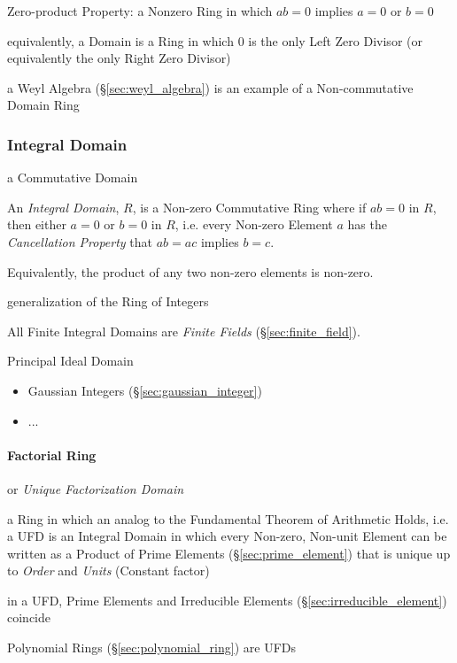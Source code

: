 Zero-product Property: a Nonzero Ring in which $ab = 0$ implies $a = 0$ or
$b = 0$

equivalently, a Domain is a Ring in which $0$ is the only Left Zero Divisor (or
equivalently the only Right Zero Divisor)

a Weyl Algebra (\S\ref{sec:weyl_algebra}) is an example of a Non-commutative
Domain Ring



\subsubsection{Integral Domain}\label{sec:integral_domain}

a Commutative Domain

An \emph{Integral Domain}, $R$, is a Non-zero Commutative Ring where if $ab = 0$
in $R$, then either $a = 0$ or $b = 0$ in $R$, i.e. every Non-zero Element $a$
has the \emph{Cancellation Property} that $ab = ac$ implies $b = c$.

Equivalently, the product of any two non-zero elements is non-zero.

generalization of the Ring of Integers

All Finite Integral Domains are \emph{Finite Fields} (\S\ref{sec:finite_field}).

Principal Ideal Domain

\begin{itemize}
  \item Gaussian Integers (\S\ref{sec:gaussian_integer})
  \item ...
\end{itemize}



\paragraph{Factorial Ring}\label{sec:factorial_ring}\hfill

or \emph{Unique Factorization Domain}

a Ring in which an analog to the Fundamental Theorem of Arithmetic Holds, i.e. a
UFD is an Integral Domain in which every Non-zero, Non-unit Element can be
written as a Product of Prime Elements (\S\ref{sec:prime_element}) that is
unique up to \emph{Order} and \emph{Units} (Constant factor)

in a UFD, Prime Elements and Irreducible Elements
(\S\ref{sec:irreducible_element}) coincide

Polynomial Rings (\S\ref{sec:polynomial_ring}) are UFDs



